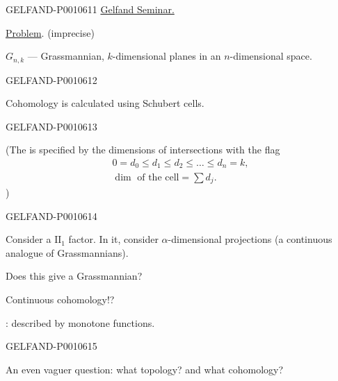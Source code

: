 \begin{GelfandAdjacentEvidence}{GELFAND-P001061}{1}
\qquad\underline{Gelfand Seminar.}

\quad\underline{Problem}. (imprecise)

\(G_{n,k}\) — Grassmannian, \(k\){}-dimensional planes in an \(n\){}-dimensional space.
\end{GelfandAdjacentEvidence}
\begin{GelfandAdjacentEvidence}{GELFAND-P001061}{2}


Cohomology is calculated using Schubert cells.
\end{GelfandAdjacentEvidence}
\begin{GelfandAdjacentEvidence}{GELFAND-P001061}{3}


(The  is specified by the dimensions of intersections with the flag
\begin{gather*}
0=d_0\leqslant d_1\leqslant d_2\leqslant\ldots\leqslant d_n=k,\\
\dim\text{ of the cell}=\sum d_j.
\end{gather*}
)
\end{GelfandAdjacentEvidence}
\begin{GelfandAdjacentEvidence}{GELFAND-P001061}{4}


Consider a \(\mathrm{II}_1\){} factor. In it, consider \(\alpha\){}-dimensional projections (a continuous analogue of Grassmannians).


Does this give a Grassmannian?

Continuous cohomology!?

: described by monotone functions.
\end{GelfandAdjacentEvidence}
\begin{GelfandAdjacentEvidence}{GELFAND-P001061}{5}


An even vaguer question: what topology? and what cohomology?
\end{GelfandAdjacentEvidence}
